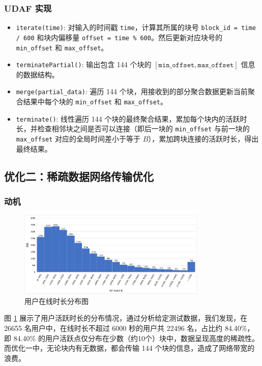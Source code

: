 \documentclass[UTF8]{ctexart}
\begin{document}
\subsubsection{UDAF 实现}
\begin{itemize}
    \item \texttt{iterate(time)}: 对输入的时间戳 \texttt{time}，计算其所属的块号 \texttt{block\_id = time / 600} 和块内偏移量 \texttt{offset = time \% 600}。然后更新对应块号的 \texttt{min\_offset} 和 \texttt{max\_offset}。
    \item \texttt{terminatePartial()}: 输出包含 144 个块的 $\left[\texttt{min\_offset}, \texttt{max\_offset}\right]$ 信息的数据结构。
    \item \texttt{merge(partial\_data)}: 遍历 144 个块，用接收到的部分聚合数据更新当前聚合结果中每个块的 \texttt{min\_offset} 和 \texttt{max\_offset}。
    \item \texttt{terminate()}: 线性遍历 144 个块的最终聚合结果，累加每个块内的活跃时长，并检查相邻块之间是否可以连接（即后一块的 \texttt{min\_offset} 与前一块的 \texttt{max\_offset} 对应的全局时间差小于等于 $B$），累加跨块连接的活跃时长，得出最终结果。
\end{itemize}

\subsection{优化二：稀疏数据网络传输优化}
\subsubsection{动机}

\FloatBarrier

\begin{figure}[ht]
    \centering
    \includegraphics[width=0.8\textwidth]{duration_distribution.png}
    \caption{用户在线时长分布图}
    \label{fig:duration_dist}
\end{figure}

图 \ref{fig:duration_dist} 展示了用户活跃时长的分布情况，通过分析给定测试数据，我们发现，在 26655 名用户中，在线时长不超过 6000 秒的用户共 22496 名，占比约 84.40\%，即 84.40\% 的用户活跃点仅分布在少数（约10个）块中，数据呈现高度的稀疏性。而优化一中，无论块内有无数据，都会传输 144 个块的信息，造成了网络带宽的浪费。
\end{document}
